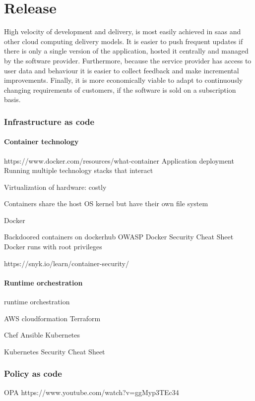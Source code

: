 \section{Release}

High velocity of development and delivery, is most easily achieved in \gls{saas} and other cloud computing delivery models.
It is easier to push frequent updates if there is only a single version of the application, hosted it centrally and managed by the software provider.
Furthermore, because the service provider has access to user data and behaviour it is easier to collect feedback and make incremental improvements.
Finally, it is more economically viable to adapt to continuously changing requirements of customers, if the software is sold on a subscription basis.



\subsubsection{Infrastructure as code}

\paragraph{Container technology}
https://www.docker.com/resources/what-container
Application deployment
Running multiple technology stacks that interact

Virtualization of hardware: costly

Containers share the host OS kernel but have their own file system

Docker

Backdoored containers on dockerhub
OWASP Docker Security Cheat Sheet
Docker runs with root privileges

https://snyk.io/learn/container-security/

\paragraph{Runtime orchestration}
runtime orchestration

AWS cloudformation
Terraform

Chef
Ansible 
Kubernetes

Kubernetes Security Cheat Sheet

\subsubsection{Policy as code}
OPA
https://www.youtube.com/watch?v=ggMyp3TEc34